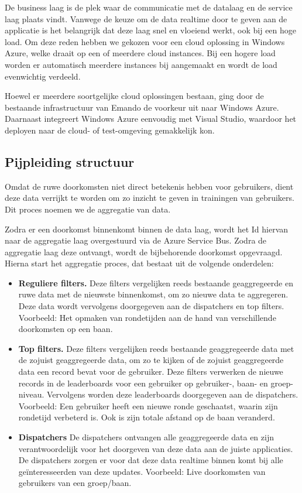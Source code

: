 De business laag is de plek waar de communicatie met de datalaag en de service laag plaats vindt. Vanwege de keuze om de data realtime door te geven aan de applicatie is het belangrijk dat deze laag snel en vloeiend werkt, ook bij een hoge load. Om deze reden hebben we gekozen voor een cloud oplossing in Windows Azure, welke draait op een of meerdere cloud instances. Bij een hogere load worden er automatisch meerdere instances bij aangemaakt en wordt de load evenwichtig verdeeld.

Hoewel er meerdere soortgelijke cloud oplossingen bestaan, ging door de bestaande infrastructuur van Emando de voorkeur uit naar Windows Azure. Daarnaast integreert Windows Azure eenvoudig met Visual Studio, waardoor het deployen naar de cloud- of test-omgeving gemakkelijk kon.


\subsection{Pijpleiding structuur}
Omdat de ruwe doorkomsten niet direct betekenis hebben voor gebruikers, dient deze data verrijkt te worden om zo inzicht te geven in trainingen van gebruikers. Dit proces noemen we de aggregatie van data.

Zodra er een doorkomst binnenkomt binnen de data laag, wordt het Id hiervan naar de aggregatie laag overgestuurd via de Azure Service Bus. Zodra de aggregatie laag deze ontvangt, wordt de bijbehorende doorkomst opgevraagd. Hierna start het aggregatie proces, dat bestaat uit de volgende onderdelen:

\begin{itemize}
\item \textbf{Reguliere filters.}
Deze filters vergelijken reeds bestaande geaggregeerde en ruwe data met de nieuwste binnenkomst, om zo nieuwe data te aggregeren. Deze data wordt vervolgens doorgegeven aan de dispatchers en top filters. Voorbeeld: Het opmaken van rondetijden aan de hand van verschillende doorkomsten op een baan.
\item \textbf{Top filters.}
Deze filters vergelijken reeds bestaande geaggregeerde data met de zojuist geaggregeerde data, om zo te kijken of de zojuist geaggregeerde data een record bevat voor de gebruiker. Deze filters verwerken de nieuwe records in de leaderboards voor een gebruiker op gebruiker-, baan- en groep-niveau. Vervolgens worden deze leaderboards doorgegeven aan de dispatchers. Voorbeeld: Een gebruiker heeft een nieuwe ronde geschaatst, waarin zijn rondetijd verbeterd is. Ook is zijn totale afstand op de baan veranderd. 
\item \textbf{Dispatchers}
De dispatchers ontvangen alle geaggregeerde data en zijn verantwoordelijk voor het doorgeven van deze data aan de juiste applicaties. De dispatchers zorgen er voor dat deze data realtime binnen komt bij alle geïnteresseerden van deze updates. 
Voorbeeld: Live doorkomsten van gebruikers van een groep/baan. 
\end{itemize}

